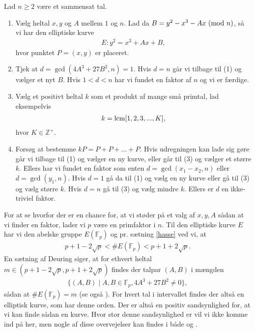 \begin{algorithm}
Lad $n \geq 2$ være et sammensat tal.
\begin{enumerate}
	\item Vælg heltal $x, y$ og $A$ mellem $1$ og $n$. Lad da $B = y^2 - x^3 - Ax \ (\mathrm{mod} \ n)$, så vi har den 	 
	elliptiske kurve
	\begin{align*}
		E : y^2 = x^3 + Ax + B, 
	\end{align*}
	hvor punktet $P=(x, y)$ er placeret.
	\item Tjek at $d = \gcd(4A^3 + 27B^2, n) = 1$. Hvis $d=n$ går vi tilbage
	til (1) og vælger et nyt $B$. Hvis $1 < d < n$ har vi fundet en faktor af $n$ og vi er færdige.
	\item Vælg et positivt heltal $k$ som et produkt af mange små primtal, lad eksempelvis
	\begin{align*}
		k = \mathrm{lcm}[1, 2, 3, ..., K],
	\end{align*}
	hvor $K \in \mathbb{Z}^+$.
	\item Forsøg at bestemme $kP = P + P + \ldots + P$. Hvis udregningen kan lade sig gøre går vi tilbage til (1) og 
	vælger en ny kurve, eller går til (3) og vælger et større $k$. Ellers har vi fundet en faktor som enten
	$d=\gcd(x_1 - x_2, n)$ eller $d=\gcd(y_1, n)$. Hvis $d=1$ gå da til (1) og vælg en ny kurve eller gå til (3) og 
	vælg større $k$. Hvis $d=n$ gå til (3) og vælg mindre $k$. Ellers er $d$ en ikke-triviel faktor.
\end{enumerate}
\end{algorithm}
For at se hvorfor der er en chance for, at vi støder på et valg af $x, y, A$ sådan at vi finder en faktor, lader vi $p$ være en primfaktor i $n$. Til den elliptiske kurve $E$ har vi den abelske gruppe $E(\mathbb{F}_p)$ og pr. sætning \ref{hasse} ved vi, at
\begin{align*}
	p + 1 - 2 \sqrt{p} < \#E(\mathbb{F}_p) < p + 1 + 2 \sqrt{p}.
\end{align*} 
En sætning af Deuring \cite{Deuring} siger, at for ethvert heltal $m \in (p+1-2\sqrt{p}, p+1+2\sqrt{p})$ findes der talpar $(A, B)$ i mængden
\begin{align*}
	\{ (A, B) \mid A, B \in \mathbb{F}_p, 4A^3 +27B^2 \neq 0 \},
\end{align*}
sådan at $\#E(\mathbb{F}_p) = m$ (se også \cite[afsnit~7.3]{Primes}). For hvert tal i intervallet findes der altså en elliptisk kurve, som har denne orden. Der er altså en positiv sandsynlighed for, at vi kan finde sådan en kurve. Hvor stor denne sandsynlighed er vil vi ikke komme ind på her, men nogle af disse overvejelser kan findes i både \cite{Lenstra} og \cite{Primes}.
